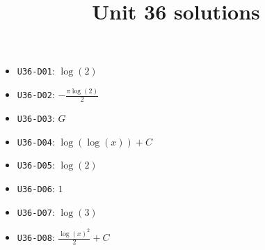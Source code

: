 \title{Unit 36 solutions}\maketitle\begin{itemize}
  \item \texttt{U36-D01}: $\log{\left(2 \right)}$
  \item \texttt{U36-D02}: $- \frac{\pi \log{\left(2 \right)}}{2}$
  \item \texttt{U36-D03}: $G$
  \item \texttt{U36-D04}: $\log{\left(\log{\left(x \right)} \right)}+C$
  \item \texttt{U36-D05}: $\log{\left(2 \right)}$
  \item \texttt{U36-D06}: $1$
  \item \texttt{U36-D07}: $\log{\left(3 \right)}$
  \item \texttt{U36-D08}: $\frac{\log{\left(x \right)}^{2}}{2}+C$
\end{itemize}
